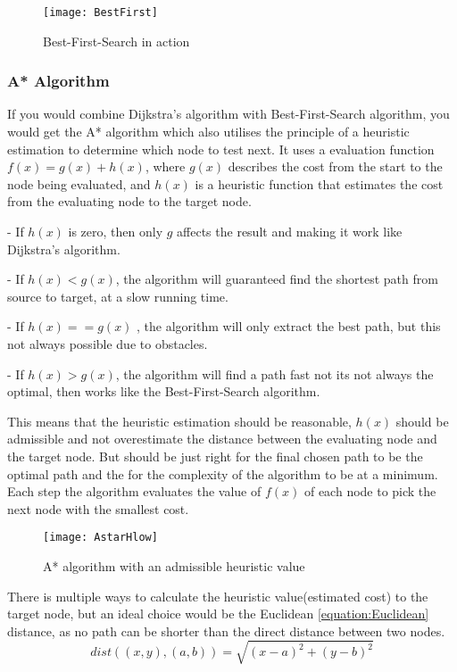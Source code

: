   \begin{figure}[ht!]
    \centering
    \texttt{[image: BestFirst]} 
    \caption{Best-First-Search in action}
    \label{bestfirst}
  \end{figure}

  \subsubsection{A* Algorithm}

  If you would combine Dijkstra's algorithm with Best-First-Search algorithm, you would get the A* algorithm which also utilises the principle of a heuristic estimation to determine which node to test next. It uses a evaluation function $f(x) = g(x) + h(x)$, where $g(x)$ describes the cost from the start to the node being evaluated, and $h(x)$ is a heuristic function that estimates the cost from the evaluating node to the target node. \cite{http://theory.stanford.edu/}

  - If $h(x)$ is zero, then only $g$ affects the result and making it work like Dijkstra's algorithm.

  - If $h(x) < g(x)$, the algorithm will guaranteed find the shortest path from source to target, at a slow running time.

  - If $h(x) == g(x)$ , the algorithm will only extract the best path, but this not always possible due to obstacles.

  - If $h(x) > g(x)$, the algorithm will find a path fast not its not always the optimal, then works like the Best-First-Search algorithm.

  This means that the heuristic estimation should be reasonable, $h(x)$ should be admissible and not overestimate the distance between the evaluating node and the target node. But should be just right for the final chosen path to be the optimal path and the for the complexity of the algorithm to be at a minimum. Each step the algorithm evaluates the value of $f(x)$ of each node to pick the next node with the smallest cost.

  \begin{figure}[ht!]
    \centering
    \texttt{[image: AstarHlow]}
    \caption{A* algorithm with an admissible heuristic value}
    \label{astar}
  \end{figure}

  There is multiple ways to calculate the heuristic value(estimated cost) to the target node, but an ideal choice would be the Euclidean \ref{equation:Euclidean}  distance, as no path can be shorter than the direct distance between two nodes.
  \begin{equation} \label{equation:Euclidean}
    dist((x, y), (a, b)) = \sqrt{(x - a)^2 + (y - b)^2}
  \end{equation}

